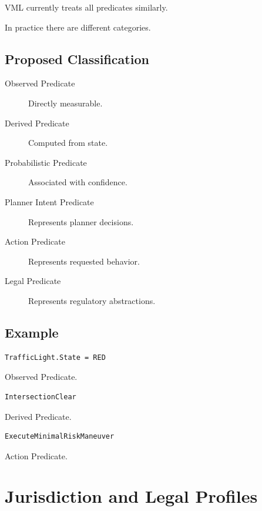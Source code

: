 \documentclass[a4paper,11pt]{article}
\begin{document}
VML currently treats all predicates similarly.

In practice there are different categories.

\subsection{Proposed Classification}

\begin{description}

\item[Observed Predicate]
Directly measurable.

\item[Derived Predicate]
Computed from state.

\item[Probabilistic Predicate]
Associated with confidence.

\item[Planner Intent Predicate]
Represents planner decisions.

\item[Action Predicate]
Represents requested behavior.

\item[Legal Predicate]
Represents regulatory abstractions.

\end{description}

\subsection{Example}

\begin{verbatim}
TrafficLight.State = RED
\end{verbatim}

Observed Predicate.

\begin{verbatim}
IntersectionClear
\end{verbatim}

Derived Predicate.

\begin{verbatim}
ExecuteMinimalRiskManeuver
\end{verbatim}

Action Predicate.

\section{Jurisdiction and Legal Profiles}
\end{document}
